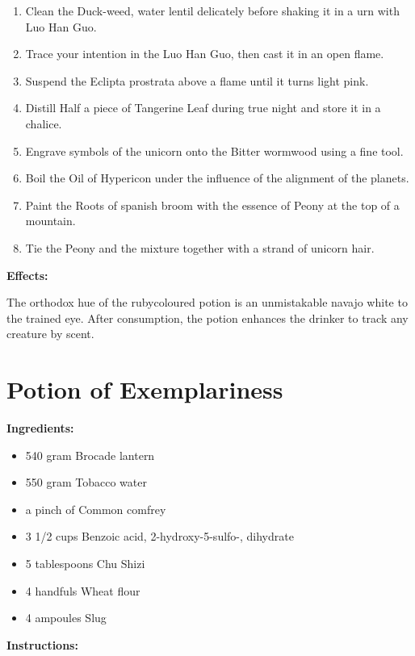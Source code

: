 \documentclass{article}
\begin{document}
\begin{enumerate}
  \item Clean the Duck-weed, water lentil delicately before shaking it in a urn with Luo Han Guo.
  \item Trace your intention in the Luo Han Guo, then cast it in an open flame.
  \item Suspend the Eclipta prostrata above a flame until it turns light pink.
  \item Distill Half a piece of Tangerine Leaf during true night and store it in a chalice.
  \item Engrave symbols of the unicorn onto the Bitter wormwood using a fine tool.
  \item Boil the Oil of Hypericon under the influence of the alignment of the planets.
  \item Paint the Roots of spanish broom with the essence of Peony at the top of a mountain.
  \item Tie the Peony and the mixture together with a strand of unicorn hair.
\end{enumerate}

\textbf{Effects:}

The orthodox hue of the rubycoloured potion is an unmistakable navajo white to the trained eye. After consumption, the potion enhances the drinker to track any creature by scent.

\newpage
\section*{Potion of Exemplariness}

\textbf{Ingredients:}

\begin{itemize}
  \item 540 gram Brocade lantern
  \item 550 gram Tobacco water
  \item a pinch of Common comfrey
  \item 3 1/2 cups Benzoic acid, 2-hydroxy-5-sulfo-, dihydrate
  \item 5 tablespoons Chu Shizi
  \item 4 handfuls Wheat flour
  \item 4 ampoules Slug
\end{itemize}

\textbf{Instructions:}
\end{document}
